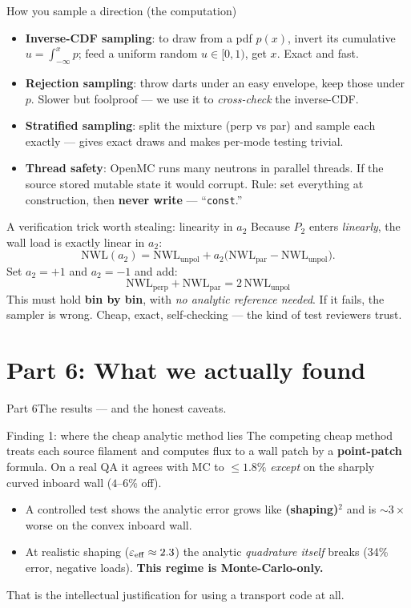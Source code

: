 \documentclass[11pt,aspectratio=169]{beamer}
\newcommand{\key}[1]{\textcolor{key}{\textbf{#1}}}
\begin{document}
\begin{frame}{How you sample a direction (the computation)}
\begin{itemize}
\item \key{Inverse-CDF sampling}: to draw from a pdf $p(x)$, invert its cumulative
$u=\int_{-\infty}^x p$; feed a uniform random $u\in[0,1)$, get $x$. Exact and fast.
\item \key{Rejection sampling}: throw darts under an easy envelope, keep those under $p$.
Slower but foolproof --- we use it to \emph{cross-check} the inverse-CDF.
\item \key{Stratified sampling}: split the mixture (perp vs par) and sample each exactly ---
gives exact draws and makes per-mode testing trivial.
\item \key{Thread safety}: OpenMC runs many neutrons in parallel threads. If the source
stored mutable state it would corrupt. Rule: set everything at construction, then
\key{never write} --- ``\texttt{const}.''
\end{itemize}
\end{frame}

\begin{frame}{A verification trick worth stealing: linearity in $a_2$}
Because $P_2$ enters \emph{linearly}, the wall load is exactly linear in $a_2$:
\[ \mathrm{NWL}(a_2) = \mathrm{NWL}_{\text{unpol}} + a_2\big(\mathrm{NWL}_{\text{par}}-\mathrm{NWL}_{\text{unpol}}\big).\]
Set $a_2=+1$ and $a_2=-1$ and add:
\[ \boxed{\;\mathrm{NWL}_{\text{perp}} + \mathrm{NWL}_{\text{par}} = 2\,\mathrm{NWL}_{\text{unpol}}\;}\]
This must hold \key{bin by bin}, with \emph{no analytic reference needed}. If it fails, the
sampler is wrong. Cheap, exact, self-checking --- the kind of test reviewers trust.
\end{frame}

\section{Part 6: What we actually found}
\begin{frame}{Part 6}\Large The results --- and the honest caveats.\end{frame}

\begin{frame}{Finding 1: where the cheap analytic method lies}
The competing cheap method treats each source filament and computes flux to a wall patch by a
\key{point-patch} formula. On a real QA it agrees with MC to $\le 1.8\%$ \emph{except} on the
sharply curved inboard wall ($4$--$6\%$ off).
\begin{itemize}
\item A controlled test shows the analytic error grows like \key{(shaping)$^2$} and is
$\sim\!3\times$ worse on the convex inboard wall.
\item At realistic shaping ($\varepsilon_{\rm eff}\approx 2.3$) the analytic \emph{quadrature
itself} breaks (34\% error, negative loads). \key{This regime is Monte-Carlo-only.}
\end{itemize}
That is the intellectual justification for using a transport code at all.
\end{frame}
\end{document}
